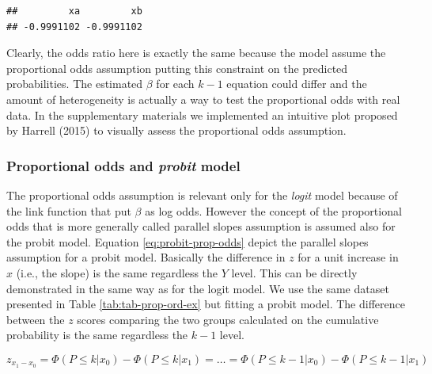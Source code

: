 \documentclass[
  man,floatsintext]{apa6}
\begin{document}
\begin{verbatim}
##         xa         xb 
## -0.9991102 -0.9991102
\end{verbatim}

\normalsize

Clearly, the odds ratio here is exactly the same because the model assume the proportional odds assumption putting this constraint on the predicted probabilities. The estimated \(\beta\) for each \(k - 1\) equation could differ and the amount of heterogeneity is actually a way to test the proportional odds with real data. In the supplementary materials we implemented an intuitive plot proposed by Harrell (2015) to visually assess the proportional odds assumption.

\subsubsection{\texorpdfstring{Proportional odds and \emph{probit} model}{Proportional odds and probit model}}\label{proportional-odds-and-probit-model}

The proportional odds assumption is relevant only for the \emph{logit} model because of the link function that put \(\beta\) as log odds. However the concept of the proportional odds that is more generally called parallel slopes assumption is assumed also for the probit model. Equation \eqref{eq:probit-prop-odds} depict the parallel slopes assumption for a probit model. Basically the difference in \(z\) for a unit increase in \(x\) (i.e., the slope) is the same regardless the \(Y\) level. This can be directly demonstrated in the same way as for the logit model. We use the same dataset presented in Table \ref{tab:tab-prop-ord-ex} but fitting a probit model. The difference between the \(z\) scores comparing the two groups calculated on the cumulative probability is the same regardless the \(k - 1\) level.

\[
z_{x_1 - x_0} = \Phi(P \leq k|x_0) - \Phi(P \leq k|x_1) = \dots = \Phi(P \leq k - 1|x_0) - \Phi(P \leq k - 1|x_1)
\]

\scriptsize
\end{document}
